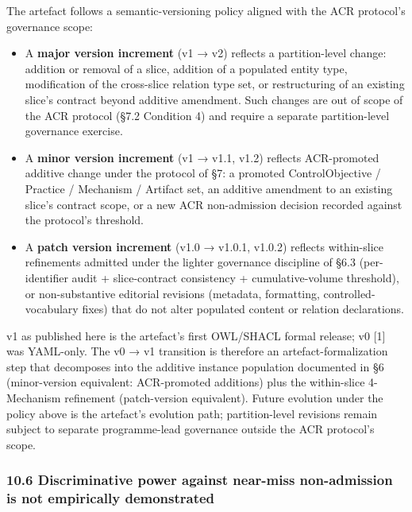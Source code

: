 \documentclass[
]{article}
\providecommand{\tightlist}{%
  \setlength{\itemsep}{0pt}\setlength{\parskip}{0pt}}
\begin{document}
The artefact follows a semantic-versioning policy aligned with the ACR
protocol's governance scope:

\begin{itemize}
\tightlist
\item
  A \textbf{major version increment} (v1 → v2) reflects a
  partition-level change: addition or removal of a slice, addition of a
  populated entity type, modification of the cross-slice relation type
  set, or restructuring of an existing slice's contract beyond additive
  amendment. Such changes are out of scope of the ACR protocol (§7.2
  Condition 4) and require a separate partition-level governance
  exercise.
\item
  A \textbf{minor version increment} (v1 → v1.1, v1.2) reflects
  ACR-promoted additive change under the protocol of §7: a promoted
  ControlObjective / Practice / Mechanism / Artifact set, an additive
  amendment to an existing slice's contract scope, or a new ACR
  non-admission decision recorded against the protocol's threshold.
\item
  A \textbf{patch version increment} (v1.0 → v1.0.1, v1.0.2) reflects
  within-slice refinements admitted under the lighter governance
  discipline of §6.3 (per-identifier audit + slice-contract consistency
  + cumulative-volume threshold), or non-substantive editorial revisions
  (metadata, formatting, controlled-vocabulary fixes) that do not alter
  populated content or relation declarations.
\end{itemize}

v1 as published here is the artefact's first OWL/SHACL formal release;
v0 {[}1{]} was YAML-only. The v0 → v1 transition is therefore an
artefact-formalization step that decomposes into the additive instance
population documented in §6 (minor-version equivalent: ACR-promoted
additions) plus the within-slice 4-Mechanism refinement (patch-version
equivalent). Future evolution under the policy above is the artefact's
evolution path; partition-level revisions remain subject to separate
programme-lead governance outside the ACR protocol's scope.

\subsubsection{10.6 Discriminative power against near-miss non-admission
is not empirically
demonstrated}\label{discriminative-power-against-near-miss-non-admission-is-not-empirically-demonstrated}
\end{document}
